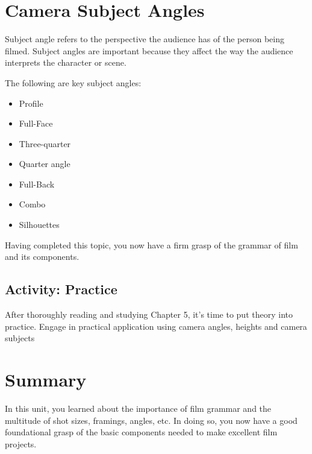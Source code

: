 \documentclass[
]{book}
\providecommand{\tightlist}{%
  \setlength{\itemsep}{0pt}\setlength{\parskip}{0pt}}
\begin{document}
\hypertarget{camera-subject-angles}{%
\section{Camera Subject Angles}\label{camera-subject-angles}}

Subject angle refers to the perspective the audience has of the person being filmed. Subject angles are important because they affect the way the audience interprets the character or scene.

The following are key subject angles:

\begin{itemize}
\tightlist
\item
  Profile\\
\item
  Full-Face\\
\item
  Three-quarter\\
\item
  Quarter angle\\
\item
  Full-Back\\
\item
  Combo\\
\item
  Silhouettes
\end{itemize}

Having completed this topic, you now have a firm grasp of the grammar of film and its components.

\hypertarget{activity-practice}{%
\subsection*{Activity: Practice}\label{activity-practice}}

\begin{reflect}
After thoroughly reading and studying Chapter 5, it's time to put theory into practice. Engage in practical application using camera angles, heights and camera subjects
\end{reflect}

\hypertarget{summary-4}{%
\section*{Summary}\label{summary-4}}

In this unit, you learned about the importance of film grammar and the multitude of shot sizes, framings, angles, etc. In doing so, you now have a good foundational grasp of the basic components needed to make excellent film projects.
\end{document}
